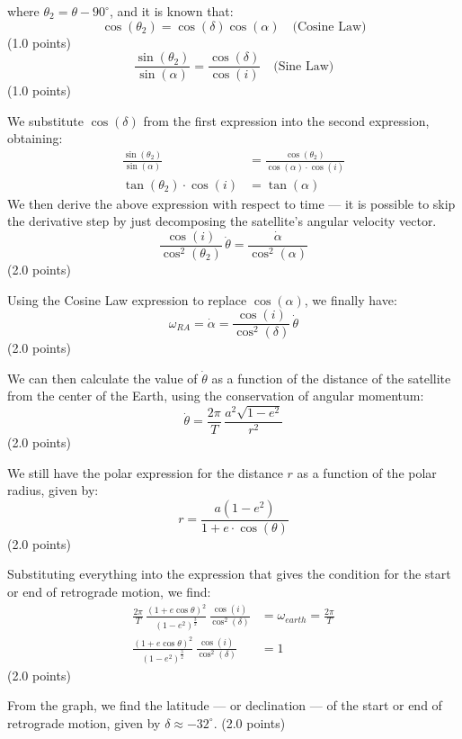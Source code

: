 \begin{description}

  where $\theta_2 = \theta - 90^\circ$, and it is known that:
  \[
    \cos(\theta_2) = \cos(\delta)\cos(\alpha) \quad\text{(Cosine Law)}
  \]
  \hfill(1.0 points)
  \[
    \frac{\sin(\theta_2)}{\sin(\alpha)} = \frac{\cos(\delta)}{\cos(i)}
    \quad\text{(Sine Law)}
  \]
  \hfill(1.0 points)

  We substitute $\cos(\delta)$ from the first expression into the second
  expression, obtaining:
  \begin{align*}
    \frac{\sin(\theta_2)}{\sin(\alpha)}
      &= \frac{\cos(\theta_2)}{\cos(\alpha)\cdot\cos(i)} \\
    \tan(\theta_2)\cdot\cos(i) &= \tan(\alpha)
  \end{align*}
  We then derive the above expression with respect to time --- it is possible
  to skip the derivative step by just decomposing the satellite's angular
  velocity vector.
  \[
    \frac{\cos(i)}{\cos^2(\theta_2)}\,\dot\theta
      = \frac{\dot\alpha}{\cos^2(\alpha)}
  \]
  \hfill(2.0 points)

  Using the Cosine Law expression to replace $\cos(\alpha)$, we finally have:
  \[
    \omega_{RA} = \dot\alpha = \frac{\cos(i)}{\cos^2(\delta)}\,\dot\theta
  \]
  \hfill(2.0 points)

  We can then calculate the value of $\dot\theta$ as a function of the
  distance of the satellite from the center of the Earth, using the
  conservation of angular momentum:
  \[
    \dot\theta = \frac{2\pi}{T}\,\frac{a^2\sqrt{1 - e^2}}{r^2}
  \]
  \hfill(2.0 points)

  We still have the polar expression for the distance $r$ as a function of the
  polar radius, given by: %
  \[
    r = \frac{a(1 - e^2)}{1 + e\cdot\cos(\theta)}
  \]
  \hfill(2.0 points)

  Substituting everything into the expression that gives the condition for the
  start or end of retrograde motion, we find:
  \begin{align*}
    \frac{2\pi}{T}\,
      \frac{(1 + e\cos\theta)^2}{(1 - e^2)^{\frac{3}{2}}}\,
      \frac{\cos(i)}{\cos^2(\delta)}
      &= \omega_{earth} = \frac{2\pi}{T} \\
    \frac{(1 + e\cos\theta)^2}{(1 - e^2)^{\frac{3}{2}}}\,
      \frac{\cos(i)}{\cos^2(\delta)} &= 1
  \end{align*}
  \hfill(2.0 points)

  From the graph, we find the latitude --- or declination --- of the start or
  end of retrograde motion, given by $\delta \approx -32^\circ$.
  \hfill(2.0 points)


\end{description}
